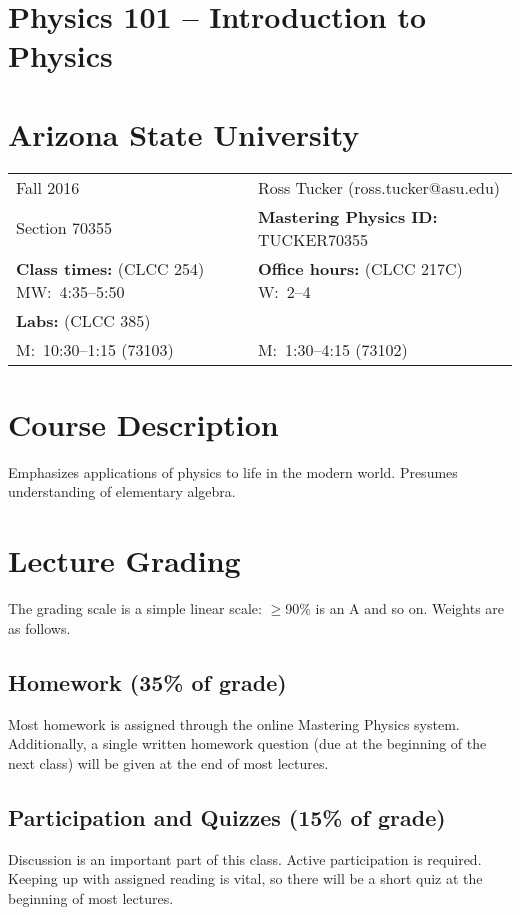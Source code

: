 \documentclass{report}
\begin{document}
\section*{Physics 101 -- Introduction to Physics}

\section*{Arizona State University}

\begin{center}
\begin{tabular}{ll}
Fall 2016                     & Ross Tucker (ross.tucker@asu.edu) \\
Section 70355                 & \textbf{Mastering Physics ID:} TUCKER70355 \\
\textbf{Class times:} (CLCC 254) MW:~4:35--5:50 & \textbf{Office hours:} (CLCC 217C) W:~2--4 \\
\textbf{Labs:} (CLCC 385)     & \\
M:~10:30--1:15 (73103)        & M:~1:30--4:15 (73102) \\

\end{tabular}
\par\end{center}

\section*{Course Description}

Emphasizes applications of physics to life in the modern world.
Presumes understanding of elementary algebra.

\section*{Lecture Grading}
The grading scale is a simple linear scale: $\ge$90\% is an A and
so on. Weights are as follows.

\subsection*{Homework (35\% of grade)}
Most homework is assigned through the online Mastering Physics system.
Additionally, a single written homework question (due at the beginning of the
next class) will be given at the end of most lectures.

\subsection*{Participation and Quizzes (15\% of grade)}
Discussion is an important part of this class. Active participation is required.
Keeping up with assigned reading is vital, so there will be a short quiz at the 
beginning of most lectures.
\end{document}
